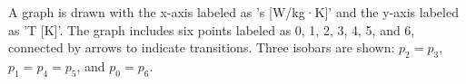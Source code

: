 A graph is drawn with the x-axis labeled as 's [W/kg·K]' and the y-axis labeled as 'T [K]'. The graph includes six points labeled as 0, 1, 2, 3, 4, 5, and 6, connected by arrows to indicate transitions. Three isobars are shown: \( p_2 = p_3 \), \( p_1 = p_4 = p_5 \), and \( p_0 = p_6 \).